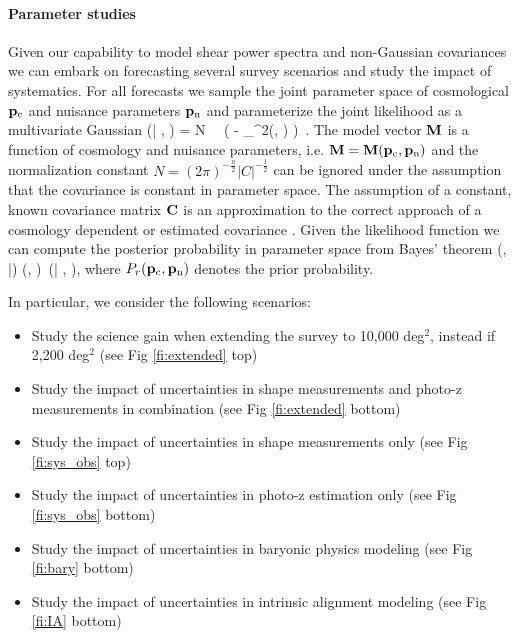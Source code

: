 \paragraph* {Parameter studies}
Given our capability to model shear power spectra and non-Gaussian covariances we can embark on forecasting several survey scenarios and study the impact of systematics. For all forecasts we sample the joint parameter space of cosmological $\mathbf p_\mathrm{c}$ and nuisance parameters $\mathbf p_\mathrm{n}$ and parameterize the joint likelihood as a multivariate Gaussian 
\be
\label{eq:like}
\like (\D| \pco, \pnu) = N \, \times \, \exp \biggl( - _{\chi^2(\pco, \pnu)}  \biggr) \,.
\ee
The model vector $\mathbf M$ is a function of cosmology and nuisance parameters, i.e. $\mathbf M=\mathbf M(\mathbf p_\mathrm{c}, \mathbf p_\mathrm{n})$ and the normalization constant $N=(2 \pi)^{-\frac{n}{2}} |C|^{-\frac{1}{2}}$ can be ignored under the assumption that the covariance is constant in parameter space. The assumption of a constant, known covariance matrix $\mathbf C$ is an approximation to the correct approach of a cosmology dependent or estimated covariance \citep[see][for further details]{esh09, seh15}.     
Given the likelihood function we can compute the posterior probability in parameter space from Bayes' theorem
\be
\label{eq:bayes}
\prob(\pco, \pnu|\D) \propto \probr (\pco, \pnu) \,\like (\D| \pco, \pnu),
\ee
where $P_r (\mathbf p_\mathrm{c}, \mathbf p_\mathrm{n})$ denotes the prior probability.


In particular, we consider the following scenarios:
\begin{itemize}
\item Study the science gain when extending the survey to 10,000 deg$^2$, instead if 2,200 deg$^2$ (see Fig \ref{fi:extended} top)
\item Study the impact of uncertainties in shape measurements and photo-z measurements in combination (see Fig \ref{fi:extended} bottom)
\item Study the impact of uncertainties in shape measurements only (see Fig \ref{fi:sys_obs} top)
\item Study the impact of uncertainties in photo-z estimation only (see Fig \ref{fi:sys_obs} bottom)
\item Study the impact of uncertainties in baryonic physics modeling (see Fig \ref{fi:bary} bottom)
\item Study the impact of uncertainties in intrinsic alignment modeling (see Fig \ref{fi:IA} bottom) 
\end{itemize}




